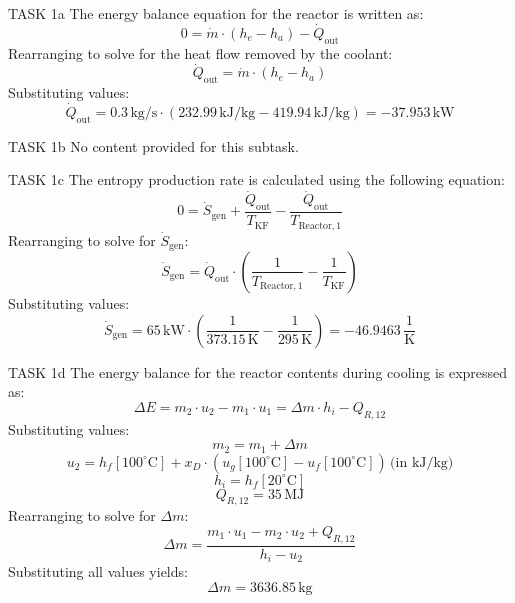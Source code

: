 TASK 1a  
The energy balance equation for the reactor is written as:  
\[
0 = \dot{m} \cdot (h_e - h_a) - \dot{Q}_{\text{out}}
\]  
Rearranging to solve for the heat flow removed by the coolant:  
\[
\dot{Q}_{\text{out}} = \dot{m} \cdot (h_e - h_a)
\]  
Substituting values:  
\[
\dot{Q}_{\text{out}} = 0.3 \, \text{kg/s} \cdot (232.99 \, \text{kJ/kg} - 419.94 \, \text{kJ/kg}) = -37.953 \, \text{kW}
\]  

TASK 1b  
No content provided for this subtask.  

TASK 1c  
The entropy production rate is calculated using the following equation:  
\[
0 = \dot{S}_{\text{gen}} + \frac{\dot{Q}_{\text{out}}}{T_{\text{KF}}} - \frac{\dot{Q}_{\text{out}}}{T_{\text{Reactor},1}}
\]  
Rearranging to solve for \( \dot{S}_{\text{gen}} \):  
\[
\dot{S}_{\text{gen}} = \dot{Q}_{\text{out}} \cdot \left( \frac{1}{T_{\text{Reactor},1}} - \frac{1}{T_{\text{KF}}} \right)
\]  
Substituting values:  
\[
\dot{S}_{\text{gen}} = 65 \, \text{kW} \cdot \left( \frac{1}{373.15 \, \text{K}} - \frac{1}{295 \, \text{K}} \right) = -46.9463 \, \frac{\text{1}}{\text{K}}
\]  

TASK 1d  
The energy balance for the reactor contents during cooling is expressed as:  
\[
\Delta E = m_2 \cdot u_2 - m_1 \cdot u_1 = \Delta m \cdot h_i - Q_{R,12}
\]  
Substituting values:  
\[
m_2 = m_1 + \Delta m
\]  
\[
u_2 = h_f[100^\circ\text{C}] + x_D \cdot (u_g[100^\circ\text{C}] - u_f[100^\circ\text{C}]) \, \text{(in kJ/kg)}
\]  
\[
h_i = h_f[20^\circ\text{C}]
\]  
\[
Q_{R,12} = 35 \, \text{MJ}
\]  
Rearranging to solve for \( \Delta m \):  
\[
\Delta m = \frac{m_1 \cdot u_1 - m_2 \cdot u_2 + Q_{R,12}}{h_i - u_2}
\]  
Substituting all values yields:  
\[
\Delta m = 3636.85 \, \text{kg}
\]